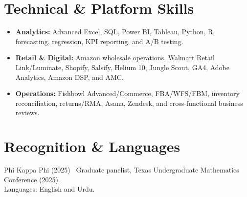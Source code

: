 \documentclass[a4paper,12pt]{article}
\newcommand{\resumeSubHeadingListStart}{
\begin{itemize}[leftmargin=*,labelsep=1mm]
}
\newcommand{\resumeSubHeadingListEnd}{
\end{itemize}\vspace{1.5mm}
}
\begin{document}
\section{\textbf{Technical \& Platform Skills}}
\resumeSubHeadingListStart
\item \textbf{Analytics:} Advanced Excel, SQL, Power BI, Tableau, Python, R, forecasting, regression, KPI reporting, and A/B testing.
\vspace{-1.6mm}
\item \textbf{Retail \& Digital:} Amazon wholesale operations, Walmart Retail Link/Luminate, Shopify, Salsify, Helium 10, Jungle Scout, GA4, Adobe Analytics, Amazon DSP, and AMC.
\vspace{-1.6mm}
\item \textbf{Operations:} Fishbowl Advanced/Commerce, FBA/WFS/FBM, inventory reconciliation, returns/RMA, Asana, Zendesk, and cross-functional business reviews.
\resumeSubHeadingListEnd
\vspace{-4mm}
\section{\textbf{Recognition \& Languages}}
Phi Kappa Phi (2025) \textbar\ Graduate panelist, Texas Undergraduate Mathematics Conference (2025).\\
Languages: English and Urdu.
\end{document}
